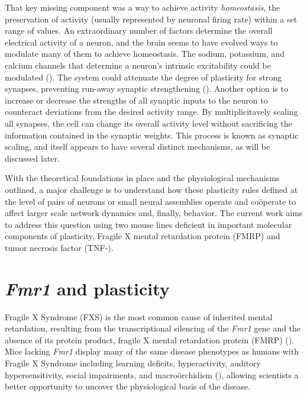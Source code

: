 That key missing component was a way to achieve activity \textit{homeostasis}, the preservation of activity (usually represented by neuronal firing rate) within a set range of values. An extraordinary number of factors determine the overall electrical activity of a neuron, and the brain seems to have evolved ways to modulate many of them to achieve homeostasis. The sodium, potassium, and calcium channels that determine a neuron's intrinsic excitability could be modulated (\cite{Franklin1992}). The system could attenuate the degree of plasticity for strong synapses, preventing run-away synaptic strengthening (\cite{VanRossum2000}). Another option is to increase or decrease the strengths of all synaptic inputs to the neuron to counteract deviations from the desired activity range. By multiplicitavely scaling all synapses, the cell can change its overall activity level without sacrificing the information contained in the synaptic weights. This process is known as synaptic scaling, and itself appears to have several distinct mechanisms, as will be discussed later.

With the theoretical foundations in place and the physiological mechanisms outlined, a major challenge is to understand how these plasticity rules defined at the level of pairs of neurons or small neural assemblies operate and co\"operate to affect larger scale network dynamics and, finally, behavior. The current work aims to address this question using two mouse lines deficient in important molecular components of plasticity, Fragile X mental retardation protein (FMRP) and tumor necrosis factor \textalpha{} (TNF-\textalpha{}).

\section{\textit{Fmr1} and plasticity}

Fragile X Syndrome (FXS) is the most common cause of inherited mental retardation, resulting from the transcriptional silencing of the \textit{Fmr1} gene and the absence of its protein product, fragile X mental retardation protein (FMRP) (\cite{Bailey1998, Jin2003}). Mice lacking \textit{Fmr1} display many of the same disease phenotypes as humans with Fragile X Syndrome including learning deficits, hyperactivity, auditory hypersensitivity, social impairments, and macro\"orchidism (\cite{DutchBelgianFragileXConsortium1994, Bernardet2006, Moy2008}), allowing scientists a better opportunity to uncover the physiological basis of the disease.

